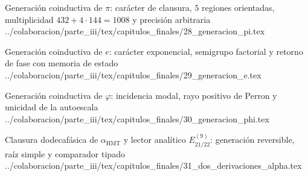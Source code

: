 \HMTFlushCurrentChapter
\HMTSuccessorChapterInput
  {Generación coinductiva de \texorpdfstring{\(\pi\)}{pi}: carácter de clausura, \(5\) regiones orientadas, multiplicidad \texorpdfstring{\(432+4\cdot144=1008\)}{432+4x144=1008} y precisión arbitraria}
  {../colaboracion/parte_iii/tex/capitulos_finales/28_generacion_pi.tex}

\HMTFlushCurrentChapter
\HMTSuccessorChapterInput
  {Generación coinductiva de \texorpdfstring{\(e\)}{e}: carácter exponencial, semigrupo factorial y retorno de fase con memoria de estado}
  {../colaboracion/parte_iii/tex/capitulos_finales/29_generacion_e.tex}

\HMTFlushCurrentChapter
\HMTSuccessorChapterInput
  {Generación coinductiva de \texorpdfstring{\(\varphi\)}{phi}: incidencia modal, rayo positivo de Perron y unicidad de la autoescala}
  {../colaboracion/parte_iii/tex/capitulos_finales/30_generacion_phi.tex}

\begin{HMTScientificOwnerSubordinated}

\end{HMTScientificOwnerSubordinated}
\begingroup
\let\HMTRecoveredOriginalPart\part
\let\part\section
\begin{HMTScientificOwnerSubordinated}


\end{HMTScientificOwnerSubordinated}
\let\part\HMTRecoveredOriginalPart
\endgroup

\HMTFlushCurrentChapter
\HMTSuccessorChapterInput
  {Clausura dodecafásica de \texorpdfstring{\(\alpha_{\mathrm{HMT}}\)}{alpha HMT} y lector analítico \texorpdfstring{\(E_{21/22}^{(9)}\)}{E21/22 de orden 9}: generación reversible, raíz simple y comparador tipado}
  {../colaboracion/parte_iii/tex/capitulos_finales/31_dos_derivaciones_alpha.tex}


